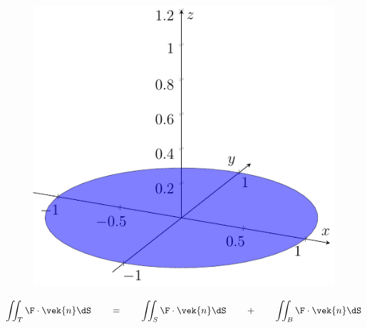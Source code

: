 \begin{frame}
\begin{figure}[ht]
\begin{minipage}[b]{0.30\linewidth}
        \end{minipage}
        \hspace{0.30cm}
        \begin{minipage}[b]{0.30\linewidth}
            \centering
            \includegraphics[width=\textwidth]{../img/2-Bunn.pdf}
        \end{minipage}
    \end{figure}
\begin{align*}
    \iint_{T} \F \cdot \vek{n} \dS
    \qquad =  \qquad 
    \iint_{S} \F \cdot \vek{n} \dS
    \qquad + \qquad  
    \iint_{B} \F \cdot \vek{n} \dS
\end{align*}
\end{frame}


